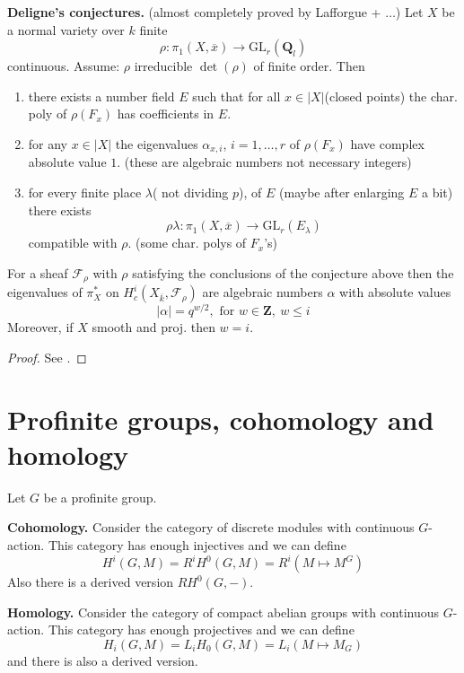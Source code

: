 \medskip\noindent
{\bf Deligne's conjectures.} (almost completely proved by
Lafforgue + $\ldots$) Let $X$ be a normal variety over $k$ finite
$$
\rho : \pi_1(X, \overline{x}) \longrightarrow \text{GL}_r(\mathbf{Q}_l)
$$
continuous. Assume: $\rho$ irreducible $\det(\rho)$ of finite order. Then
\begin{enumerate}
\item there exists a number field $E$ such that for all $x\in
|X|$(closed points) the char. poly of $\rho(F_x)$ has coefficients in $E$.
\item for any $x\in |X|$ the eigenvalues $\alpha_{x, i}$, $i = 1, \ldots,
r$ of $\rho(F_x)$ have complex absolute value $1$.
(these are algebraic numbers not necessary integers)
\item for every finite place $\lambda$( not dividing $p$), of $E$
(maybe after enlarging $E$ a bit) there exists
$$
\rho\lambda : \pi_1(X, \overline{x}) \to \text{GL}_r(E_\lambda)
$$
compatible with $\rho$. (some char. polys of $F_x$'s)
\end{enumerate}

\begin{theorem}
\label{theorem-weil-II}
For a sheaf
$\mathcal{F}_\rho$ with $\rho$ satisfying the conclusions of the conjecture
above then the eigenvalues of $\pi_X^*$ on $H_c^i(X_{\overline{k}},
\mathcal{F}_{\rho})$ are algebraic numbers $\alpha$ with absolute values
$$
|\alpha|=q^{w/2}, \text{ for }w\in \mathbf{Z},\ w\leq i
$$
Moreover, if $X$ smooth and proj. then $w = i$.
\end{theorem}

\begin{proof}
See \cite{WeilII}.
\end{proof}




\section{Profinite groups, cohomology and homology}
\label{section-profinite-cohomology}

\noindent
Let $G$ be a profinite group.

\medskip\noindent
{\bf Cohomology.}
Consider the category of discrete modules with continuous $G$-action.
This category has enough injectives and we can define
$$
H^i(G, M) = R^iH^0(G, M) = R^i(M\mapsto M^G)
$$
Also there is a derived version $RH^0(G, -)$.

\medskip\noindent
{\bf Homology.}
Consider the category of compact abelian groups with continuous $G$-action.
This category has enough projectives and we can define
$$
H_i(G, M) = L_iH_0(G, M)=L_i(M\mapsto M_G)
$$
and there is also a derived version.

